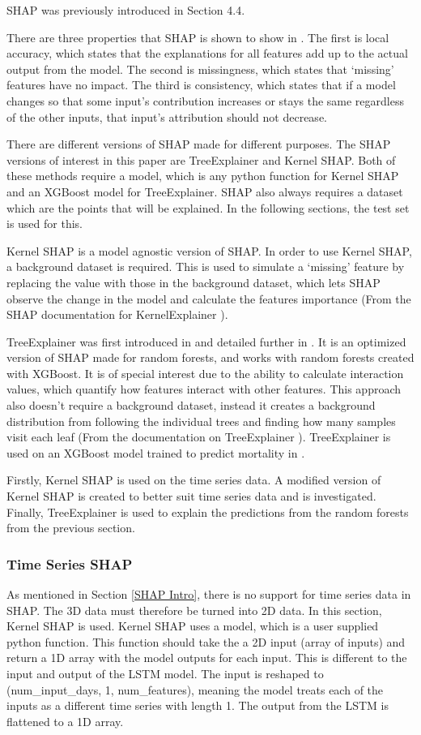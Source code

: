 \documentclass[12pt]{article}
\begin{document}
SHAP was previously introduced in Section 4.4. 

There are three properties that SHAP is shown to show in \cite{SHAP}. The first is local accuracy, which states that the explanations for all features add up to the actual output from the model. The second is missingness, which states that `missing' features have no impact. The third is consistency, which states that if a model changes so that some input's contribution increases or stays the same regardless of the other inputs, that input’s attribution should not decrease. 

There are different versions of SHAP made for different purposes. The SHAP versions of interest in this paper are TreeExplainer and Kernel SHAP. Both of these methods require a model, which is any python function for Kernel SHAP and an XGBoost model for TreeExplainer. SHAP also always requires a dataset which are the points that will be explained. In the following sections, the test set is used for this.

Kernel SHAP is a model agnostic version of SHAP. In order to use Kernel SHAP, a background dataset is required. This is used to simulate a `missing' feature by replacing the value with those in the background dataset, which lets SHAP observe the change in the model and calculate the features importance (From the SHAP documentation for KernelExplainer \cite{SHAP}).

TreeExplainer was first introduced in \cite{SHAPInteraction} and detailed further in \cite{TreeExplainer}. It is an optimized version of SHAP made for random forests, and works with random forests created with XGBoost. It is of special interest due to the ability to calculate interaction values, which quantify how features interact with other features. This approach also doesn't require a background dataset, instead it creates a background distribution from following the individual trees and finding how many samples visit each leaf (From the documentation on TreeExplainer \cite{SHAP}). TreeExplainer is used on an XGBoost model trained to predict mortality in \cite{TreeExplainerXGBoost}.

Firstly, Kernel SHAP is used on the time series data. A modified version of Kernel SHAP is created to better suit time series data and is investigated. Finally, TreeExplainer is used to explain the predictions from the random forests from the previous section. 

\subsubsection{Time Series SHAP}
\label{Time Series SHAP}
As mentioned in Section \ref{SHAP Intro}, there is no support for time series data in SHAP. The 3D data must therefore be turned into 2D data. In this section, Kernel SHAP is used. Kernel SHAP uses a model, which is a user supplied python function. This function should take the a 2D input (array of inputs) and return a 1D array with the model outputs for each input. This is different to the input and output of the LSTM model. The input is reshaped to (num\_input\_days, 1, num\_features), meaning the model treats each of the inputs as a different time series with length 1. The output from the LSTM is flattened to a 1D array. 
\end{document}

